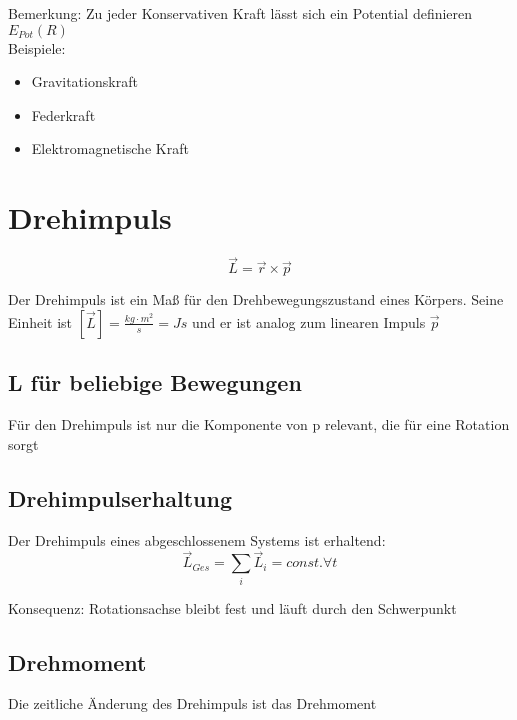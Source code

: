 \documentclass[a4paper,12pt]{report}
\begin{document}
Bemerkung: Zu jeder Konservativen Kraft lässt sich ein Potential definieren $ E_{Pot}(R) $ \\

Beispiele:
\begin{itemize}
\item Gravitationskraft
\item Federkraft
\item Elektromagnetische Kraft
\end{itemize}

\section{Drehimpuls}

\begin{equation*}
\vec{L} = \vec{r} \times \vec{p}
\end{equation*}



Der Drehimpuls ist ein Maß für den Drehbewegungszustand eines Körpers. Seine Einheit ist $ [\vec{L}] = \frac{kg \cdot m^2}{s} = Js$ und er ist analog zum linearen Impuls $\vec{p} $ \\

\subsection{L für beliebige Bewegungen}

Für den Drehimpuls ist nur die Komponente von p relevant,
 die für eine Rotation sorgt

\subsection{Drehimpulserhaltung}

Der Drehimpuls eines abgeschlossenem Systems ist erhaltend: \\
\begin{equation}
\vec{L}_{Ges} = \sum_i\vec{L}_i = const. \forall t
\end{equation}

Konsequenz: Rotationsachse bleibt fest und läuft durch den Schwerpunkt

\subsection{Drehmoment}

Die zeitliche Änderung des Drehimpuls ist das Drehmoment \\
\end{document}
